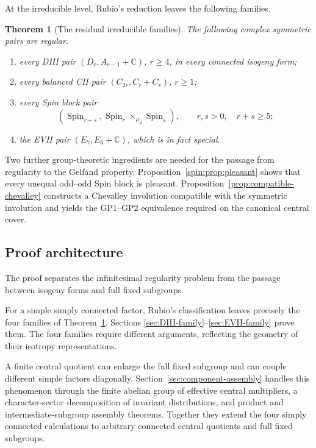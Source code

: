 \documentclass[11pt,reqno]{amsart}
\numberwithin{equation}{section}
\newtheorem{theorem}{Theorem}[section]
\theoremstyle{definition}
\theoremstyle{remark}
\newcommand{\C}{\mathbb C}
\newcommand{\Spin}{\operatorname{Spin}}
\begin{document}
At the irreducible level, Rubio's reduction leaves the following families.

\begin{theorem}[The residual irreducible families]\label{thm:four-inputs}
The following complex symmetric pairs are regular.
\begin{enumerate}[label=\textup{(\roman*)}]
\item every DIII pair $(D_r,A_{r-1}+\C)$, $r\geq4$, in every connected
isogeny form;
\item every balanced CII pair $(C_{2r},C_r+C_r)$, $r\geq1$;
\item every Spin block pair
\[
 (\Spin_{r+s},\Spin_r\times_{\mu_2}\Spin_s),\qquad r,s>0,\quad r+s\geq5;
\]
\item the EVII pair $(E_7,E_6+\C)$, which is in fact special.
\end{enumerate}
\end{theorem}

Two further group-theoretic ingredients are needed for the passage from
regularity to the Gelfand property.  Proposition~\ref{spin:prop:pleasant} shows that every
unequal odd--odd Spin block is pleasant.  Proposition~\ref{prop:compatible-chevalley}
constructs a Chevalley involution compatible with the symmetric involution and
yields the GP1--GP2 equivalence required on the canonical central cover.

\subsection{Proof architecture}

The proof separates the infinitesimal regularity problem from the passage
between isogeny forms and full fixed subgroups.

For a simple simply connected factor, Rubio's classification leaves precisely
the four families of Theorem~\ref{thm:four-inputs}.  Sections
\ref{sec:DIII-family}--\ref{sec:EVII-family} prove them.  The four families require different arguments, reflecting the geometry of
their isotropy representations.

A finite central quotient can enlarge the full fixed subgroup and can couple
different simple factors diagonally.  Section~\ref{sec:component-assembly}
handles this phenomenon through the finite abelian group of effective central
multipliers, a character-sector decomposition of invariant distributions, and
product and intermediate-subgroup assembly theorems.  Together they extend the four simply connected calculations to arbitrary
connected central quotients and full fixed subgroups.
\end{document}
